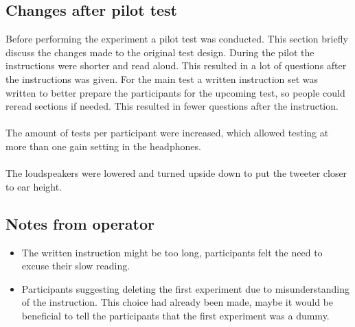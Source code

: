 \subsection{Changes after pilot test}
Before performing the experiment a pilot test was conducted. This section briefly discuss the changes made to the original test design. 
During the pilot the instructions were shorter and read aloud. This resulted in a lot of questions after the instructions was given. For the main test a written instruction set was written to better prepare the participants for the upcoming test, so people could reread sections if needed. This resulted in fewer questions after the instruction. \\\\
The amount of tests per participant were increased, which allowed testing at more than one gain setting in the headphones. \\\\
The loudspeakers were lowered and turned upside down to put the tweeter closer to ear height. 

\subsection{Notes from operator}
\begin{itemize}
\item The written instruction might be too long, participants felt the need to excuse their slow reading.
\item Participants suggesting deleting the first experiment due to misunderstanding of the instruction. This choice had already been made, maybe it would be beneficial to tell the participants that the first experiment was a dummy. 
\end{itemize}

